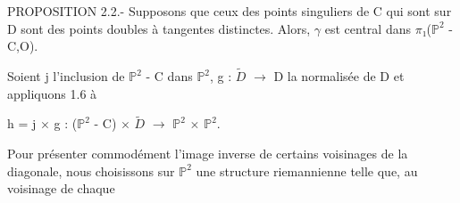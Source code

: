 \documentclass[10pt,a4paper]{article}
\begin{document}
\begin{adjustbox}{max totalsize={\textwidth}{0.945\textheight},center}
\begin{minipage}{\textwidth}
\noindent PROPOSITION 2.2.- Supposons que ceux des points singuliers de C qui sont sur D sont des points doubles à tangentes distinctes. Alors, \ensuremath{γ} est central dans \ensuremath{π₁}(\ensuremath{ℙ^2} - C,O).\par\smallskip
\noindent Soient j l'inclusion de \ensuremath{ℙ^2} - C dans \ensuremath{ℙ^2}, g : \ensuremath{\widetilde{D}} \ensuremath{→} D la normalisée de D et appliquons 1.6 à\par\smallskip
\noindent h = j \ensuremath{×} g : (\ensuremath{ℙ^2} - C) \ensuremath{×} \ensuremath{\widetilde{D}} \ensuremath{→} \ensuremath{ℙ^2} \ensuremath{×} \ensuremath{ℙ^2}.\par\smallskip
\noindent Pour présenter commodément l'image inverse de certains voisinages de la diagonale, nous choisissons sur \ensuremath{ℙ^2} une structure riemannienne telle que, au voisinage de chaque\par\smallskip
\end{minipage}
\end{adjustbox}
\newpage
\end{document}
